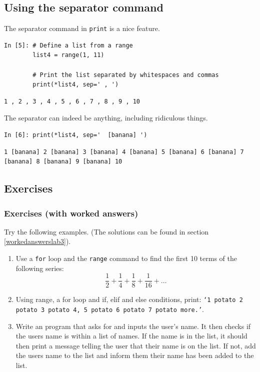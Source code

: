 \subsection{Using the separator command}

The separator command in {\tt print} is a nice feature.

\begin{lstlisting}[style=PY]
In [5]: # Define a list from a range 
        list4 = range(1, 11)
        
        # Print the list separated by whitespaces and commas
        print(*list4, sep=' , ')
\end{lstlisting}
\begin{lstlisting}[style=PY_out]
        1 , 2 , 3 , 4 , 5 , 6 , 7 , 8 , 9 , 10
\end{lstlisting}
The separator can indeed be anything, including ridiculous things.
\begin{lstlisting}[style=PY]
In [6]: print(*list4, sep='  [banana] ')
\end{lstlisting}
\begin{lstlisting}[style=PY_out]
        1 [banana] 2 [banana] 3 [banana] 4 [banana] 5 [banana] 6 [banana] 7 [banana] 8 [banana] 9 [banana] 10
\end{lstlisting}

\subsection{Exercises}
\subsubsection{Exercises (with worked answers)}
\label{rangeexercises}
\noindent Try the following examples. (The solutions can be found in section \ref{workedanswerslab3}).
\begin{enumerate}
\item Use a {\tt for} loop and the {\tt range} command to find the first 10 terms of the following series: $$\frac{1}{2}+\frac{1}{4}+\frac{1}{8}+\frac{1}{16}+\ldots$$
\item Using range, a for loop and if, elif and else conditions, print: \texttt{`1 potato 2 potato 3 potato 4, 5 potato 6 potato 7 potato more.'}.
\item Write an program that asks for and inputs the user's name. It then checks if the users name is within a list of names. If the name is in the list, it should then print a message telling the user that their name is on the list. If not, add the users name to the list and inform them their name has been added to the list.
\end{enumerate}

